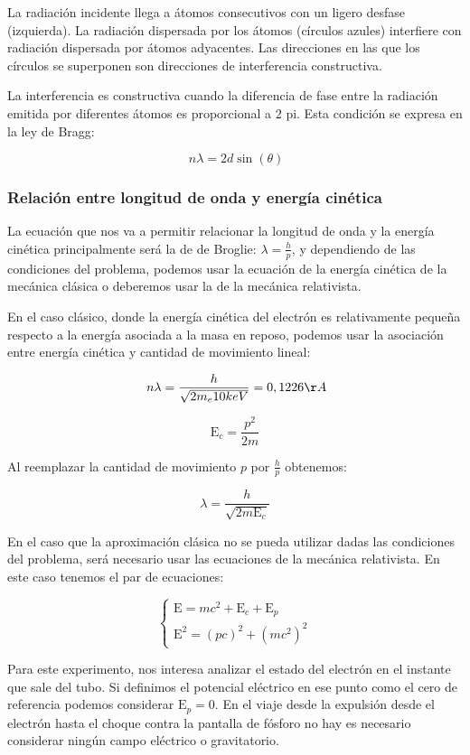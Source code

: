 \documentclass[]{article}
\begin{document}
La radiación incidente llega a átomos consecutivos con un ligero desfase
(izquierda). La radiación dispersada por los átomos (círculos azules)
interfiere con radiación dispersada por átomos adyacentes. Las
direcciones en las que los círculos se superponen son direcciones de
interferencia constructiva.

La interferencia es constructiva cuando la diferencia de fase entre la
radiación emitida por diferentes átomos es proporcional a 2 pi. Esta
condición se expresa en la ley de Bragg:

\[\ n \lambda = 2 d \sin(\theta)\]

\hypertarget{relaciuxf3n-entre-longitud-de-onda-y-energuxeda-cinuxe9tica}{%
\subsubsection{Relación entre longitud de onda y energía
cinética}\label{relaciuxf3n-entre-longitud-de-onda-y-energuxeda-cinuxe9tica}}

La ecuación que nos va a permitir relacionar la longitud de onda y la
energía cinética principalmente será la de de Broglie:
\(\lambda = \frac{h}{p}\), y dependiendo de las condiciones del
problema, podemos usar la ecuación de la energía cinética de la mecánica
clásica o deberemos usar la de la mecánica relativista.

En el caso clásico, donde la energía cinética del electrón es
relativamente pequeña respecto a la energía asociada a la masa en
reposo, podemos usar la asociación entre energía cinética y cantidad de
movimiento lineal:

\[\ n \lambda = \frac{h}{\sqrt{2m_e 10keV}} = 0,1226 \AA\]

\[\mathrm{E}_c = \frac{p^2}{2m}\]

Al reemplazar la cantidad de movimiento \(p\) por \(\frac{h}{p}\)
obtenemos:

\[ \lambda = \frac{h}{\sqrt{2m\mathrm{E}_c}} \]

En el caso que la aproximación clásica no se pueda utilizar dadas las
condiciones del problema, será necesario usar las ecuaciones de la
mecánica relativista. En este caso tenemos el par de ecuaciones:

\[
\left\{\begin{matrix}
    \mathrm{E} = mc^2 + \mathrm{E}_c + \mathrm{E}_p\\
    \mathrm{E}^2 = (pc)^2 + (mc^2)^2
\end{matrix}\right.
\]

Para este experimento, nos interesa analizar el estado del electrón en
el instante que sale del tubo. Si definimos el potencial eléctrico en
ese punto como el cero de referencia podemos considerar
\(\mathrm{E}_p = 0\). En el viaje desde la expulsión desde el electrón
hasta el choque contra la pantalla de fósforo no hay es necesario
considerar ningún campo eléctrico o gravitatorio.
\end{document}
